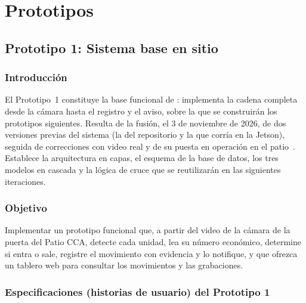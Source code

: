 \chapter{Prototipos}
\label{cap:prototipos}

\section{Prototipo 1: Sistema base en sitio}
\label{sec:prototipo1}

\subsection{Introducción}

El Prototipo~1 constituye la base funcional de \saru{}: implementa la
cadena completa desde la cámara hasta el registro y el aviso, sobre la que
se construirán los prototipos siguientes. Resulta de la fusión, el 3 de
noviembre de 2026, de dos versiones previas del sistema (la del repositorio
y la que corría en la Jetson), seguida de correcciones con video real y de
su puesta en operación en el patio~\cite{rep-fusion,rep-envivo}. Establece
la arquitectura en capas, el esquema de la base de datos, los tres modelos
en cascada y la lógica de cruce que se reutilizarán en las siguientes
iteraciones.

\subsection{Objetivo}

Implementar un prototipo funcional que, a partir del video de la cámara de
la puerta del Patio CCA, detecte cada unidad, lea su número económico,
determine si entra o sale, registre el movimiento con evidencia y lo
notifique, y que ofrezca un tablero web para consultar los movimientos y
las grabaciones.

\subsection{Especificaciones (historias de usuario) del Prototipo 1}

